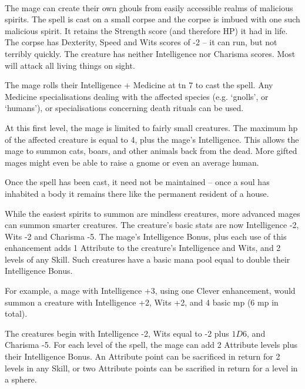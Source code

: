 \begin{multicols}{2}
\spelllevel

\\
The mage can create their own ghouls from easily accessible realms of malicious spirits. The spell is cast on a small corpse and the corpse is imbued with one such malicious spirit. It retains the Strength score (and therefore HP) it had in life.
The corpse has Dexterity, Speed and Wits scores of -2 -- it can run, but not terribly quickly.
The creature has neither Intelligence nor Charisma scores. Most will attack all living things on sight.

The mage rolls their Intelligence + Medicine at \gls{tn} 7 to cast the spell. Any Medicine specialisations dealing with the affected species (e.g. `gnolls', or `humans'), or specialisations concerning death rituals can be used.

At this first level, the mage is limited to fairly small creatures.  The maximum \gls{hp} of the affected creature is equal to 4, plus the mage's Intelligence.  This allows the mage to summon cats, boars, and other animals back from the dead.  More gifted mages might even be able to raise a gnome or even an average human.

Once the spell has been cast, it need not be maintained -- once a soul has inhabited a body it remains there like the permanent resident of a house.


While the easiest spirits to summon are mindless creatures, more advanced mages can summon smarter creatures.  The creature's basic stats are now Intelligence -2, Wits -2 and Charisma -5.  The mage's Intelligence Bonus, plus each use of this enhancement adds 1 Attribute to the creature's Intelligence and Wits, and 2 levels of any Skill.  Such creatures have a basic mana pool equal to double their Intelligence Bonus.  

For example, a mage with Intelligence +3, using one Clever enhancement, would summon a creature with Intelligence +2, Wits +2, and 4 basic \gls{mp} (6 \gls{mp} in total).

The creatures begin with Intelligence -2, Wits equal to -2 plus $1D6$, and Charisma -5.  For each level of the spell, the mage can add 2 Attribute levels plus their Intelligence Bonus.  An Attribute point can be sacrificed in return for 2 levels in any Skill, or two Attribute points can be sacrified in return for a level in a sphere.


\end{multicols}
